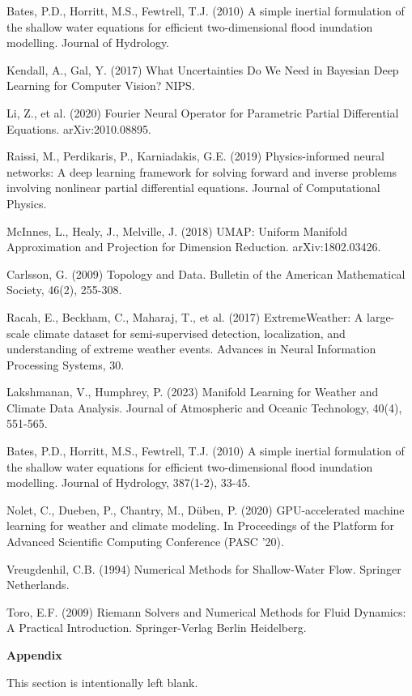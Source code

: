 \documentclass{article}
\begin{document}
\begin{thebibliography}{99}
 Bates, P.D., Horritt, M.S., Fewtrell, T.J. (2010) A simple inertial formulation of the shallow water equations for efficient two-dimensional flood inundation modelling. Journal of Hydrology.

 Kendall, A., Gal, Y. (2017) What Uncertainties Do We Need in Bayesian Deep Learning for Computer Vision? NIPS.

 Li, Z., et al. (2020) Fourier Neural Operator for Parametric Partial Differential Equations. arXiv:2010.08895.

 Raissi, M., Perdikaris, P., Karniadakis, G.E. (2019) Physics-informed neural networks: A deep learning framework for solving forward and inverse problems involving nonlinear partial differential equations. Journal of Computational Physics.

 McInnes, L., Healy, J., Melville, J. (2018) UMAP: Uniform Manifold Approximation and Projection for Dimension Reduction. arXiv:1802.03426.

 Carlsson, G. (2009) Topology and Data. Bulletin of the American Mathematical Society, 46(2), 255-308.

 Racah, E., Beckham, C., Maharaj, T., et al. (2017) ExtremeWeather: A large-scale climate dataset for semi-supervised detection, localization, and understanding of extreme weather events. Advances in Neural Information Processing Systems, 30.

 Lakshmanan, V., Humphrey, P. (2023) Manifold Learning for Weather and Climate Data Analysis. Journal of Atmospheric and Oceanic Technology, 40(4), 551-565.

 Bates, P.D., Horritt, M.S., Fewtrell, T.J. (2010) A simple inertial formulation of the shallow water equations for efficient two-dimensional flood inundation modelling. Journal of Hydrology, 387(1-2), 33-45.

 Nolet, C., Dueben, P., Chantry, M., Düben, P. (2020) GPU-accelerated machine learning for weather and climate modeling. In Proceedings of the Platform for Advanced Scientific Computing Conference (PASC '20).

 Vreugdenhil, C.B. (1994) Numerical Methods for Shallow-Water Flow. Springer Netherlands.

 Toro, E.F. (2009) Riemann Solvers and Numerical Methods for Fluid Dynamics: A Practical Introduction. Springer-Verlag Berlin Heidelberg.

\end{thebibliography}

\clearpage
\appendix
\Huge\bfseries{Appendix}

\vspace*{1cm}
\small
This section is intentionally left blank.
\end{document}
